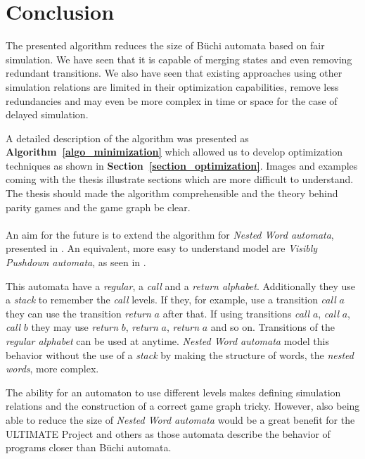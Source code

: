 \documentclass[12pt,oneside,bibliography=totoc,abstracton]{scrartcl}
\newcommand{\sectionref}[1]{\textbf{Section~\ref{#1}}}
\newcommand{\algoref}[1]{\textbf{Algorithm~\ref{#1}}}
\newcommand{\libref}[1]{\textbf{\cite{#1}}}
\begin{document}
\section{Conclusion}
The presented algorithm reduces the size of Büchi automata based on fair simulation. We have seen that it is capable of merging
states and even removing redundant transitions. We also have seen that existing approaches using other simulation
relations are limited in their optimization capabilities, remove less redundancies and may even be more complex in time or space
for the case of delayed simulation.

A detailed description of the algorithm was presented as \algoref{algo_minimization} which allowed
us to develop optimization techniques as shown in \sectionref{section_optimization}.
Images and examples coming with the thesis illustrate sections which are more difficult to understand.
The thesis should made the algorithm comprehensible and the theory behind parity games and
the game graph be clear.\\\\
An aim for the future is to extend the algorithm for \textit{Nested Word automata}, presented in \libref{nwa}.
An equivalent, more easy to understand model are \textit{Visibly Pushdown automata}, as seen in \libref{vpa}.

This automata have a \textit{regular}, a \textit{call} and a \textit{return alphabet}.
Additionally they use a \textit{stack} to remember the \textit{call} levels.
If they, for example, use a transition \textit{call} $a$ they can use the transition \textit{return} $a$ after that.
If using transitions \textit{call} $a$, \textit{call} $a$, \textit{call} $b$ they may use \textit{return} $b$,
\textit{return} $a$, \textit{return} $a$ and so on. Transitions of the \textit{regular alphabet} can be used at anytime.
\textit{Nested Word automata} model this behavior without the use of a \textit{stack} by making the structure
of words, the \textit{nested words}, more complex.

The ability for an automaton to use different levels makes defining simulation relations and the construction
of a correct game graph tricky. However, also being able to reduce the size of \textit{Nested Word automata}
would be a great benefit for the ULTIMATE Project \libref{ultimate} and others as those automata describe
the behavior of programs closer than Büchi automata.

\clearpage


\end{document}

